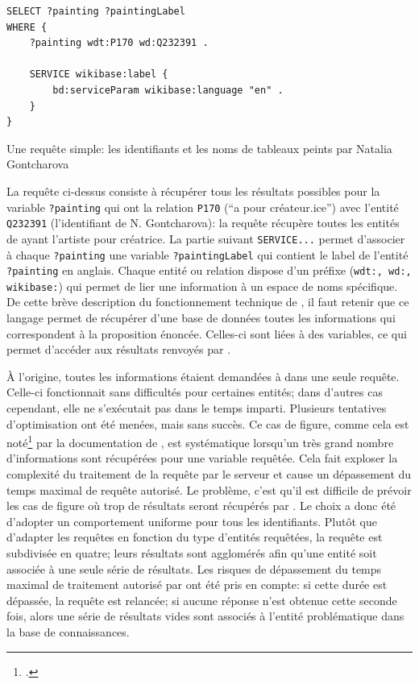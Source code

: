 \begin{listing}[h!]
	\begin{verbatim}
SELECT ?painting ?paintingLabel 
WHERE {
	?painting wdt:P170 wd:Q232391 .
	
	SERVICE wikibase:label {
		bd:serviceParam wikibase:language "en" .
	}
}
	\end{verbatim}
	\caption{Une requête simple: les identifiants et les noms de tableaux peints par Natalia Gontcharova}
	\label{code:sparql}
\end{listing}

La requête ci-dessus consiste à récupérer tous les résultats possibles pour la variable \texttt{?painting} qui ont la relation \texttt{P170} (\enquote{a pour créateur.ice}) avec l'entité \texttt{Q232391} (l'identifiant de N. Gontcharova): la requête récupère toutes les entités de \wkd{} ayant l'artiste pour créatrice. La partie suivant \texttt{SERVICE...} permet d'associer à chaque \texttt{?painting} une variable \texttt{?paintingLabel} qui contient le label de l'entité \texttt{?painting} en anglais. Chaque entité ou relation dispose d'un préfixe (\texttt{wdt:, wd:, wikibase:}) qui permet de lier une information à un espace de noms spécifique. De cette brève description du fonctionnement technique de \sparql{}, il faut retenir que ce langage permet de récupérer d'une base de données toutes les informations qui correspondent à la proposition énoncée. Celles-ci sont liées à des variables, ce qui permet d'accéder aux résultats renvoyés par \sparql{}.

À l'origine, toutes les informations étaient demandées à \sparql{} dans une seule requête. Celle-ci fonctionnait sans difficultés pour certaines entités; dans d'autres cas cependant, elle ne s'exécutait pas dans le temps imparti. Plusieurs tentatives d'optimisation ont été menées, mais sans succès. Ce cas de figure, comme cela est noté\footcite{noauthor_query_2022} par la documentation \sparql{} de \wkd{}, est systématique lorsqu'un très grand nombre d'informations sont récupérées pour une variable requêtée. Cela fait exploser la complexité du traitement de la requête par le serveur et cause un dépassement du temps maximal de requête autorisé. Le problème, c'est qu'il est difficile de prévoir les cas de figure où trop de résultats seront récupérés par \sparql{}. Le choix a donc été d'adopter un comportement uniforme pour tous les identifiants. Plutôt que d'adapter les requêtes en fonction du type d'entités requêtées, la requête est subdivisée en quatre; leurs résultats sont agglomérés afin qu'une entité soit associée à une seule série de résultats. Les risques de dépassement du temps maximal de traitement autorisé par \wkd{} ont été pris en compte: si cette durée est dépassée, la requête est relancée; si aucune réponse n'est obtenue cette seconde fois, alors une série de résultats vides sont associés à l'entité problématique dans la base de connaissances.

